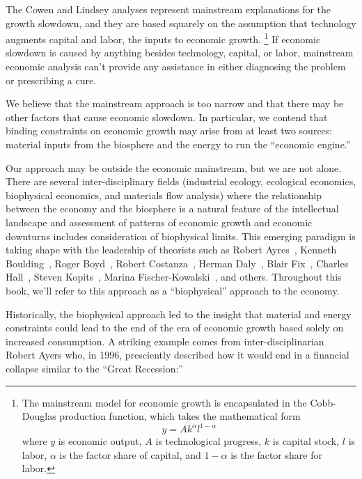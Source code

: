 The Cowen and Lindsey analyses represent mainstream explanations for the growth slowdown,
and they are based squarely on the assumption that technology augments 
capital and labor, the inputs to economic growth.%
	\footnote{
	The mainstream model for economic growth is encapsulated in the
	Cobb-Douglas production function, which takes the mathematical form
	\begin{equation*}
		y = A k^{\alpha} l^{1-\alpha}
	\end{equation*}	 
	where 
	$y$ is economic output, 
	$A$ is technological progress,
	$k$ is capital stock, 
	$l$ is labor, 
	$\alpha$ is the factor share of capital, and
	$1-\alpha$ is the factor share for labor.
	}
If economic slowdown is caused by anything besides
technology, capital, or labor,
mainstream economic analysis can't provide any assistance
in either diagnosing the problem or prescribing a cure.

We believe that the mainstream approach is too narrow and
that there may be other factors that cause economic slowdown.
In particular,  
we contend that binding constraints on economic growth may arise from
at least two sources: 
material inputs from the biosphere and 
the energy to run the ``economic engine.''

Our approach may be outside the economic mainstream,
but we are not alone. 
There are several inter-disciplinary fields 
(industrial ecology, ecological economics, biophysical economics, and
materials flow analysis)
where the relationship between the 
economy and the biosphere is a natural feature of the intellectual landscape
and assessment of patterns of economic growth and economic downturns  
includes consideration of biophysical limits. 
This emerging paradigm is taking shape with the leadership of theorists
such as 
Robert Ayres~\cite{Ayres:2010ug}, 
Kenneth Boulding~\cite{Boulding1966}, 
Roger Boyd~\cite{boyd2013energy},
Robert Costanza~\cite{Cleveland:1984aa}, 
Herman Daly~\cite{Daly1977}, 
Blair Fix~\cite{Fix:2014aa},
Charles Hall~\cite{hall2011energy}, 
Steven Kopits~\cite{Kopits:2009aa},
Marina Fischer-Kowalski~\cite{F-K1999},
and others.
Throughout this book, we'll refer to this approach as a ``biophysical'' approach
to the economy.

Historically, the biophysical approach led to the insight 
that material and energy constraints could lead to the 
end of the era of economic growth based solely on increased
consumption.
A striking example comes from 
inter-disciplinarian Robert Ayers who, in 1996, presciently described 
how it would end in a financial collapse similar to the ``Great Recession:''

